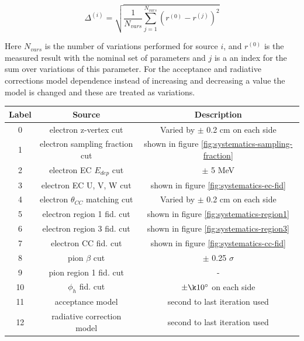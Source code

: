 \begin{equation}
	\Delta^{(i)} = \sqrt{\frac{1}{N_{vars}} \sum_{j = 1}^{N_{vars}} (r^{(0)} - r^{(j)})^2}
	\label{eqn:rms}

\end{equation}

Here $N_{vars}$ is the number of variations performed for source $i$, and $r^{(0)}$ is the measured result with the nominal set of parameters and $j$ is a an index for the sum over variations of this parameter.  For the acceptance and radiative corrections model dependence instead of increasing and decreasing a value the model is changed and these are treated as variations.  \\

\begin{table}
	\centering
	\label{table:systematic-sources}
	
	\begin{tabular}{c | c | c }
	
	Label & Source & Description \\ 
	\hline 
	
	0      & electron z-vertex cut                          & Varied by $\pm$ 0.2 cm on each side \\ 
	1      & electron sampling fraction cut            & shown in figure \ref{fig:systematics-sampling-fraction} \\ 
	2      & electron EC $E_{dep}$ cut                  & $\pm$ 5 MeV \\ 
	3      & electron EC U, V, W cut                       & shown in figure \ref{fig:systematics-ec-fid} \\ 
	4      & electron $\theta_{CC}$ matching cut & Varied by $\pm$ 0.2 cm on each side \\ 
	5      & electron region 1 fid. cut                      & shown in figure \ref{fig:systematics-region1} \\ 
	6      & electron region 3 fid. cut                     & shown in figure \ref{fig:systematics-region3} \\ 
	7      & electron CC fid. cut                              & shown in figure \ref{fig:systematics-cc-fid} \\ 
	8      & pion $\beta$ cut                                   & $\pm$ 0.25 $\sigma$ \\ 
	9      & pion region 1 fid. cut                             & - \\ 
	10    & $\phi_h$ fid. cut                                    & $\pm \k 10^{\circ}$ on each side \\ 
	11     & acceptance model                                & second to last iteration used \\ 
    12     & radiative correction model                   & second to last iteration used \\ 
	
	\end{tabular}		
\end{table}

